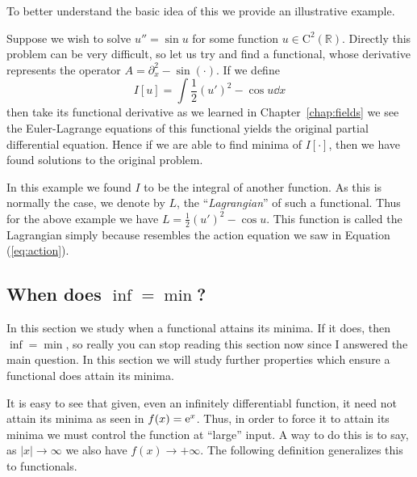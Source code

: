 To better understand the basic idea of this we provide an illustrative example.
\begin{example}
    Suppose we wish to solve \(u'' = \sin{u}\) for some function
    \(u\in\mathrm{C}^2(\mathbb{R})\). Directly this problem can be very
    difficult, so let us try and find a functional, whose derivative represents
    the operator \(A = \partial_x^2 - \sin(\cdot)\). If we define
    \begin{equation}
        I[u] = \int \frac{1}{2}(u')^2 - \cos{u}\dd{x}
    \end{equation}
    then take its functional derivative as we learned in
    Chapter~\ref{chap:fields} we see the Euler-Lagrange equations of this
    functional yields the original partial differential equation. Hence if we
    are able to find minima of \(I[\cdot]\), then we have found solutions to the
    original problem.
\end{example}
In this example we found \(I\) to be the integral of another function. As this
is normally the case, we denote by \(L\), the ``\textit{Lagrangian}'' of such a
functional. Thus for the above example we have \(L = \frac{1}{2}(u')^2 - \cos{u}\).
This function is called the Lagrangian simply because resembles the action
equation we saw in Equation (\ref{eq:action}).

\subsection{When does \texorpdfstring{\(\inf = \min\)}{inf = min}?}
In this section we study when a functional attains its minima. If it does, then
\(\inf = \min\), so really you can stop reading this section now since I
answered the main question. In this section we will study further properties
which ensure a functional does attain its minima.

It is easy to see that given, even an infinitely differentiabl function, it need
not attain its minima as seen in \(f(x) = \mathrm{e}^x\). Thus, in order to force it to
attain its minima we must control the function at ``large'' input. A way to do
this is to say, as \(|x|\to \infty\) we also have \(f(x)\to +\infty\). The
following definition generalizes this to functionals. 

